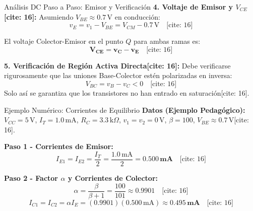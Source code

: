 \documentclass[aspectratio=169]{beamer}
\begin{document}
\begin{frame}{Análisis DC Paso a Paso: Emisor y Verificación}
    \textbf{4. Voltaje de Emisor y $V_{CE}$[cite: 16]:}
    Asumiendo $V_{BE} \approx 0.7\,\text{V}$ en conducción:
    \begin{equation*}
        v_E = v_1 - V_{BE} = V_{CM} - 0.7\,\text{V} \quad \text{[cite: 16]}
    \end{equation*}
    
    El voltaje Colector-Emisor en el punto $Q$ para ambas ramas es:
    \begin{equation*}
        \mathbf{V_{CE} = v_C - v_E} \quad \text{[cite: 16]}
    \end{equation*}
    
    \textbf{5. Verificación de Región Activa Directa[cite: 16]:}
    Debe verificarse rigurosamente que las uniones Base-Colector estén polarizadas en inversa:
    \begin{equation*}
        V_{BC} = v_B - v_C < 0 \quad \text{[cite: 16]}
    \end{equation*}
    Solo así se garantiza que los transistores no han entrado en saturación[cite: 16].
\end{frame}

\begin{frame}{Ejemplo Numérico: Corrientes de Equilibrio}
    \textbf{Datos (Ejemplo Pedagógico):} $V_{CC}=5\,\text{V}$, $I_T=1.0\,\text{mA}$, $R_C=3.3\,\text{k}\Omega$, $v_1=v_2=0\,\text{V}$, $\beta=100$, $V_{BE}\approx0.7\,\text{V}$[cite: 16].
    
    \textbf{Paso 1 - Corrientes de Emisor:}
    \begin{equation*}
        I_{E1} = I_{E2} = \frac{I_T}{2} = \frac{1.0\,\text{mA}}{2} = \mathbf{0.500\,\text{mA}} \quad \text{[cite: 16]}
    \end{equation*}
    
    \textbf{Paso 2 - Factor $\alpha$ y Corrientes de Colector:}
    \begin{equation*}
        \alpha = \frac{\beta}{\beta+1} = \frac{100}{101} \approx \mathbf{0.9901} \quad \text{[cite: 16]}
    \end{equation*}
    \begin{equation*}
        I_{C1} = I_{C2} = \alpha I_E = (0.9901)(0.500\,\text{mA}) \approx \mathbf{0.495\,\text{mA}} \quad \text{[cite: 16]}
    \end{equation*}
\end{frame}
\end{document}
